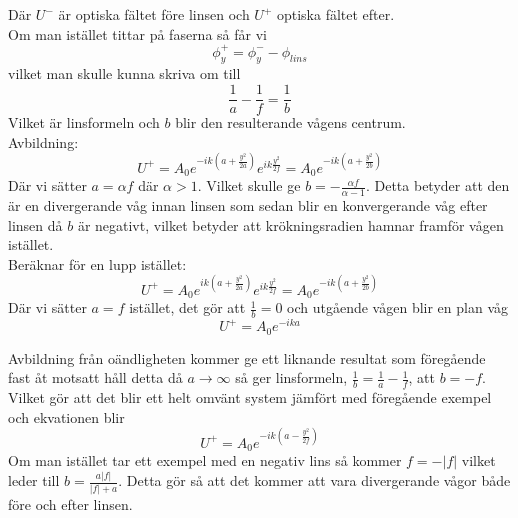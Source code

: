 \documentclass{article}
\begin{document}
    Där $U^-$ är optiska fältet före linsen och $U^+$ optiska fältet efter.\\

    Om man istället tittar på faserna så får vi
    \[
      \phi_y^+=\phi_y^--\phi_{lins}
    \]
    vilket man skulle kunna skriva om till
    \[
      \frac{1}{a}-\frac{1}{f}=\frac{1}{b}
    \]
    Vilket är linsformeln och $b$ blir den resulterande vågens centrum.\\

    Avbildning:
    \[
      U^+=A_0e^{-ik(a+\frac{y^2}{2a})}e^{ik\frac{y^2}{2f}}=A_0e^{-ik(a+\frac{y^2}{2b})}
    \]
    Där vi sätter $a=\alpha f$ där $\alpha>1$. Vilket skulle ge $b=-\frac{\alpha f}{\alpha -1}$. Detta betyder att den är en divergerande våg innan linsen som sedan blir en konvergerande våg efter linsen då $b$ är negativt, vilket betyder att krökningsradien hamnar framför vågen istället.\\

    Beräknar för en lupp istället:
    \[
      U^+=A_0e^{ik(a+\frac{y^2}{2a})}e^{ik\frac{y^2}{2f}}=A_0e^{-ik(a+\frac{y^2}{2b})}
    \]
    Där vi sätter $a=f$ istället, det gör att $\frac{1}{b}=0$ och utgående vågen blir en plan våg
    \[
      U^+=A_0e^{-ika}
    \]

    Avbildning från oändligheten kommer ge ett liknande resultat som föregående fast åt motsatt håll detta då $a\rightarrow\infty$ så ger linsformeln, $\frac{1}{b}=\frac{1}{a}-\frac{1}{f}$, att $b=-f$. Vilket gör att det blir ett helt omvänt system jämfört med föregående exempel och ekvationen blir
    \[
      U^+=A_0e^{-ik(a-\frac{y^2}{2f})}
    \]
    Om man istället tar ett exempel med en negativ lins så kommer $f=-|f|$ vilket leder till $b=\frac{a|f|}{|f|+a}$. Detta gör så att det kommer att vara divergerande vågor både före och efter linsen.
\end{document}

